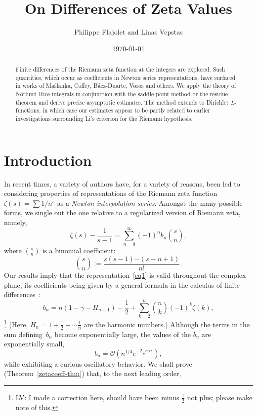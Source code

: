 \documentclass{amsart}
\begin{document}
\date{\today}
\title{On Differences of Zeta Values}
\author{Philippe Flajolet and Linas Vepstas}

\begin{abstract}
Finite differences of the Riemann zeta function at the integers
are explored. Such quantities, which occur as coefficients in Newton series representations, 
have surfaced in works of Ma{\'s}lanka, Coffey, B{\'a}ez-Duarte, Voros and others.
We apply the theory of N\"orlund-Rice integrals in conjunction with
the saddle point method or the residue theorem and derive precise 
asymptotic estimates. The method extends to Dirichlet $L$-functions,
in which case our estimates appear to be partly related to
earlier investigations surrounding Li's criterion for the Riemann hypothesis.
\end{abstract}

\maketitle

\section{Introduction}


 


In recent  times, a variety of  authors have, for a variety  of reasons,
been led  to considering   properties  of  representations of   the
Riemann zeta function $\zeta(s)=\sum 1/n^s$  as a \emph{Newton interpolation
series}.  Amongst the many  possible  forms, we single out
the one relative to a regularized version of Riemann zeta, namely,
\begin{equation}\label{eq1}
\zeta(s)-\frac{1}{s-1}=\sum_{n=0}^\infty
(-1)^n b_n \binom{s}{n},
\end{equation}
where $\binom{s}{n}$ is a binomial coefficient:
\[
\binom{s}{n}:=\frac{s(s-1)\cdots(s-n+1)}{n!}.
\]
Our results imply that the representation~\eqref{eq1} is
valid throughout the complex plane,
its coefficients being given by a general formula in the calculus of finite
differences~\cite{Jordan65,Milne81,Norlund54}:
\begin{equation}\label{eq2}
b_n=
n(1-\gamma-H_{n-1})-\frac12+\sum_{k=2}^n \binom{n}{k}
(-1)^k\zeta(k),
\end{equation}
\footnote{ LV: I made a correction here, should have been 
minus $\frac12$ not plus; please make note of this.}
(Here,
$H_n=1+\frac12+\cdots\frac1n$ are the harmonic numbers.)
Although the terms in the sum defining~$b_n$ become
exponentially large, the values of the $b_n$ are exponentially small,
\[
b_n=\mathcal{O}\left(n^{1/4}e^{-2\sqrt{\pi n}}\right),
\]
while exhibiting a curious oscillatory behavior. 
We shall prove (Theorem~\ref{zetacoeff-thm}) that, to the next leading
order,
\end{document}

